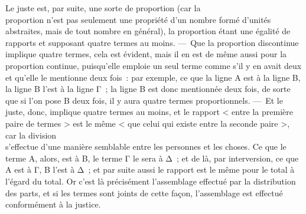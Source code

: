 \documentclass[french,twoside]{book} %
\begin{document}
Le juste est, par suite, une sorte de proportion (car la \\
proportion n’est pas seulement une propriété d’un nombre formé d’unités abstraites, mais de tout nombre en général), la proportion étant une égalité de rapports et supposant quatre termes au moins. — Que la proportion discontinue implique quatre termes, cela est évident, mais il en est de même aussi pour la proportion continue, puisqu’elle emploie un seul  terme comme s’il y en avait deux et qu’elle le mentionne deux fois : par exemple, ce que la ligne A est à la ligne B, la ligne B l’est à la ligne Γ ; la ligne B est donc mentionnée deux fois, de sorte que si l’on pose B deux fois, il y aura quatre termes proportionnels. — Et le juste, donc, implique quatre termes au moins, et le rapport < entre la première paire de termes > est le même < que celui qui existe entre la seconde paire >, car la division \\
s’effectue d’une manière semblable entre les personnes et les choses. Ce que le terme A, alors, est à B, le terme Γ le sera à Δ ; et de là, par interversion, ce que A est à Γ, B l’est à Δ ; et par suite aussi le rapport est le même pour le total à l’égard du total. Or c’est là précisément l’assemblage effectué par la distribution des parts, et si les termes sont joints de cette façon, l’assemblage est effectué conformément à la justice.
\end{document}
